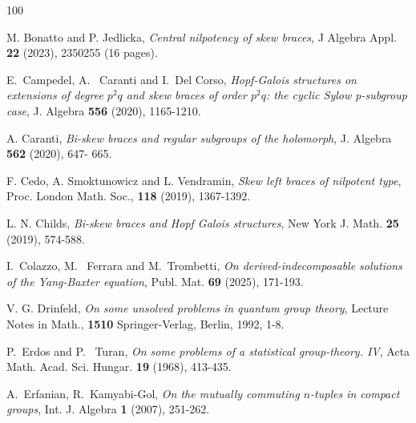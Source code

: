 \documentclass[oneside]{amsart}
\numberwithin{equation}{section}
\theoremstyle{plain}
\theoremstyle{definition}
\begin{document}
\begin{thebibliography}{100}

M. Bonatto and P. Jedlicka, \emph{Central nilpotency of skew braces}, J Algebra Appl. {\bf 22} (2023), 2350255 (16 pages).

E.~Campedel, A.~ Caranti and I.~Del Corso,  \emph{Hopf-Galois structures on extensions of degree $p^2q$ and skew braces of order $p^2q$: the cyclic Sylow p-subgroup case}, J. Algebra {\bf 556} (2020), 1165-1210.

 A. Caranti, \emph{Bi-skew braces and regular subgroups of the holomorph}, J. Algebra {\bf 562} (2020), 647- 665. 
 
 
 

F. Cedo, A.  Smoktunowicz and L.  Vendramin, {\it Skew left braces of nilpotent type}, Proc. London Math. Soc., {\bf 118} (2019), 1367-1392.

L. N. Childs,  \emph{Bi-skew braces and Hopf Galois structures}, New York J. Math. {\bf 25} (2019), 574-588.

I.~Colazzo, M.~ Ferrara and M.~Trombetti, \emph{On derived-indecomposable solutions of the Yang-Baxter equation},  Publ. Mat. {\bf 69} (2025), 171-193.

V. G. Drinfeld, \emph{On some unsolved problems in quantum group theory}, Lecture Notes in Math., {\bf 1510}
Springer-Verlag, Berlin, 1992, 1-8.

P.~Erdos and P. ~Turan,  \emph {On some problems of a statistical group-theory. {IV}}, Acta Math. Acad. Sci. Hungar. {\bf 19} (1968), 413-435.

A.~Erfanian, R.~Kamyabi-Gol, \emph{On the mutually commuting {$n$}-tuples in compact groups}, Int. J. Algebra {\bf 1} (2007), 251-262.
    


\end{thebibliography}
\end{document}
